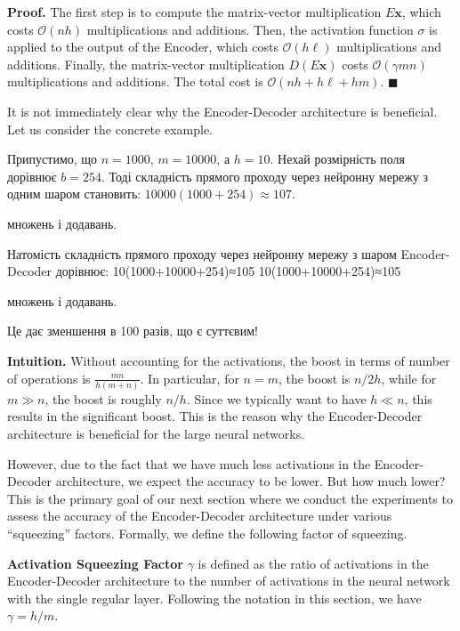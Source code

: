 \documentclass{iacrtrans}
\begin{document}
\textbf{Proof.} The first step is to compute the matrix-vector multiplication
$E\mathbf{x}$, which costs $\mathcal{O}(nh)$ multiplications and additions.
Then, the activation function $\sigma$ is applied to the output of the Encoder,
which costs $\mathcal{O}(h\ell)$ multiplications and additions. Finally, the
matrix-vector multiplication $D(E\mathbf{x})$ costs $\mathcal{O}(\gamma mn)$
multiplications and additions. The total cost is $\mathcal{O}(nh+h\ell+hm)$.
$\blacksquare$

It is not immediately clear why the Encoder-Decoder architecture is beneficial.
Let us consider the concrete example.

\begin{example}
    Припустимо, що $n = 1000$, $m = 10000$, а $h = 10$. Нехай розмірність поля
дорівнює $b = 254$. Тоді складність прямого проходу через нейронну мережу з
одним шаром становить: $10000(1000+254) \approx 107$.

множень і додавань.

Натомість складність прямого проходу через нейронну мережу з шаром Encoder-Decoder дорівнює:
10(1000+10000+254)≈105
10(1000+10000+254)≈105

множень і додавань.

Це дає зменшення в 100 разів, що є суттєвим!
\end{example}

\textbf{Intuition.} Without accounting for the activations, the boost in terms
of number of operations is $\frac{mn}{h(m+n)}$. In particular,
for $n=m$, the boost is $n/2h$, while for $m \gg n$, the boost is roughly $n/h$.
Since we typically want to have $h \ll n$, this results in the significant
boost. This is the reason why the Encoder-Decoder architecture is beneficial for
the large neural networks.

However, due to the fact that we have much less activations in the
Encoder-Decoder architecture, we expect the accuracy to be lower. But how much
lower? This is the primary goal of our next section where we conduct the
experiments to assess the accuracy of the Encoder-Decoder architecture under
various ``squeezing'' factors. Formally, we define the following factor of 
squeezing.

\begin{definition}
    \textbf{Activation Squeezing Factor} $\gamma$ is defined as the ratio of
    activations in the Encoder-Decoder architecture to the number of activations
    in the neural network with the single regular layer. Following the notation
    in this section, we have $\gamma = h/m$.
\end{definition}
\end{document}
